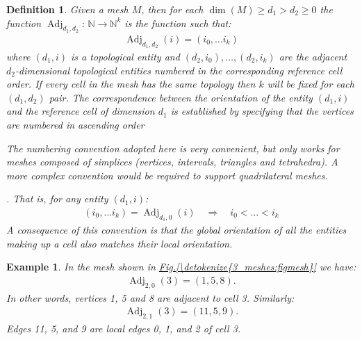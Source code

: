 \documentclass{book}
\newtheorem{definition}{Definition}
\newtheorem{example}{Example}
\begin{document}
\begin{definition}
Given a mesh \(M\), then for each \(\dim(M) \geq d_1 > d_2 \geq 0\)
the  function \(\operatorname{Adj}_{d_1,d_2}:\,
\mathbb{N}\rightarrow \mathbb{N}^k\) is the function such that:
\begin{equation*}
\begin{split}\operatorname{Adj}_{d_1,d_2}(i) = (i_0, \ldots i_k)\end{split}
\end{equation*}
where \((d_1, i)\) is a topological entity and \((d_2, i_0), \ldots,
(d_2, i_k)\) are the adjacent \(d_2\)-dimensional topological entities
numbered in the corresponding reference cell order. If every cell
in the mesh has the same topology then \(k\) will be fixed for each
\((d_1, d_2)\) pair. The correspondence between the orientation of
the entity \((d_1, i)\) and the reference cell of dimension \(d_1\) is
established by specifying that the vertices are numbered in
ascending order %
\begin{footnote}[1]\sphinxAtStartFootnote
The numbering convention adopted here is very
convenient, but only works for meshes composed
of simplices (vertices, intervals, triangles
and tetrahedra). A more complex convention
would be required to support quadrilateral
meshes.
%
\end{footnote}. That is, for any entity \((d_1, i)\):
\begin{equation*}
\begin{split}(i_0, \ldots i_k) = \operatorname{Adj}_{d_1,0}(i) \quad \Longrightarrow \quad i_0 < \ldots <i_k\end{split}
\end{equation*}
A consequence of this convention is that the global orientation of
all the entities making up a cell also matches their local
orientation.
\end{definition}
\begin{example}
In the mesh shown in \hyperref[\detokenize{3_meshes:figmesh}]{Fig.\@ \ref{\detokenize{3_meshes:figmesh}}} we have:
\begin{equation*}
\begin{split}\operatorname{Adj}_{2,0}(3) = (1,5,8).\end{split}
\end{equation*}
In other words, vertices 1, 5 and 8 are adjacent to cell 3. Similarly:
\begin{equation*}
\begin{split}\operatorname{Adj}_{2,1}(3) = (11,5,9).\end{split}
\end{equation*}
Edges 11, 5, and 9 are local edges 0, 1, and 2 of cell 3.
\end{example}
\end{document}
